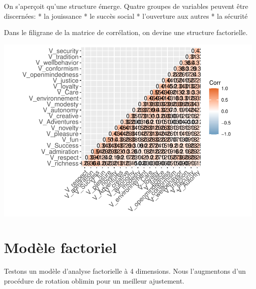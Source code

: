 \documentclass[
]{book}
\newenvironment{Shaded}{\begin{snugshade}}{\end{snugshade}}
\newcommand{\DataTypeTok}[1]{\textcolor[rgb]{0.13,0.29,0.53}{#1}}
\newcommand{\FloatTok}[1]{\textcolor[rgb]{0.00,0.00,0.81}{#1}}
\newcommand{\KeywordTok}[1]{\textcolor[rgb]{0.13,0.29,0.53}{\textbf{#1}}}
\newcommand{\NormalTok}[1]{#1}
\newcommand{\OperatorTok}[1]{\textcolor[rgb]{0.81,0.36,0.00}{\textbf{#1}}}
\newcommand{\StringTok}[1]{\textcolor[rgb]{0.31,0.60,0.02}{#1}}
\begin{document}
On s'aperçoit qu'une structure émerge. Quatre groupes de variables peuvent être discernées:
* la jouissance
* le succès social
* l'ouverture aux autres
* la sécurité

Dans le filigrane de la matrice de corrélation, on devine une structure factorielle.

\begin{Shaded}
\end{Shaded}

\includegraphics{bookdown-demo_files/figure-latex/0603b-1.pdf}

\hypertarget{moduxe8le-factoriel}{%
\section{Modèle factoriel}\label{moduxe8le-factoriel}}

Testons un modèle d'analyse factorielle à 4 dimensions. Nous l'augmentons d'un procédure de rotation oblimin pour un meilleur ajustement.
\end{document}
